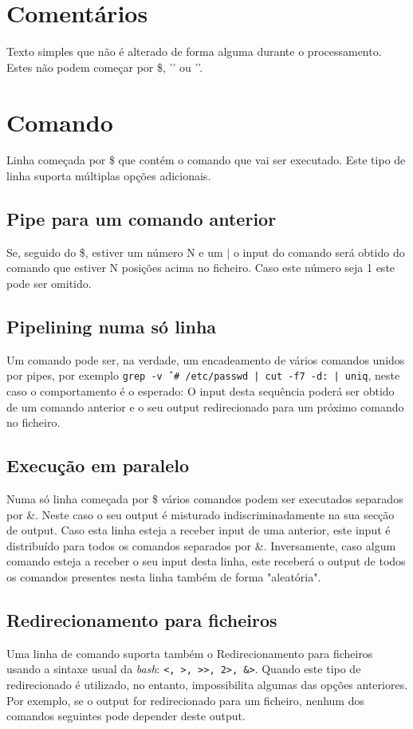 \documentclass[12pt,a4paper]{report}
\begin{document}
    \section{Comentários}
        Texto simples que não é alterado de forma alguma durante o
        processamento. Estes não podem começar por \$, '\outputStart' ou
        '\outputEnd'.
    \section{Comando}
        Linha começada por \$ que contém o comando que vai ser executado.
        Este tipo de linha suporta múltiplas opções adicionais.
        \subsection{Pipe para um comando anterior}
            Se, seguido do \$, estiver um número N e um $|$ o input do comando
            será obtido do comando que estiver N posições acima no ficheiro.
            Caso este número seja 1 este pode ser omitido.
        \subsection{Pipelining numa só linha}
            Um comando pode ser, na verdade, um encadeamento de vários comandos
            unidos por pipes, por exemplo
            \texttt{grep -v ˆ# /etc/passwd | cut -f7 -d: | uniq},
            neste caso o comportamento é o esperado: O input desta sequência
            poderá ser obtido de um comando anterior e o seu output
            redirecionado para um próximo comando no ficheiro.
        \subsection{Execução em paralelo}
            Numa só linha começada por \$ vários comandos podem ser executados
            separados por \&. Neste caso o seu output é misturado
            indiscriminadamente na sua secção de output. Caso esta linha esteja
            a receber input de uma anterior, este input é distribuído para
            todos os comandos separados por \&. Inversamente, caso algum
            comando esteja a receber o seu input desta linha, este receberá
            o output de todos os comandos presentes nesta linha também de
            forma "aleatória".
        \subsection{Redirecionamento para ficheiros}
            Uma linha de comando suporta também o Redirecionamento para
            ficheiros usando a sintaxe usual da \textit{bash}:
            \texttt{<, >, >>, 2>, &>}.
            Quando este tipo de redirecionado é utilizado, no entanto,
            impossibilita algumas das opções anteriores. Por exemplo,
            se o output for redirecionado para um ficheiro, nenhum dos comandos
            seguintes pode depender deste output.
\end{document}
